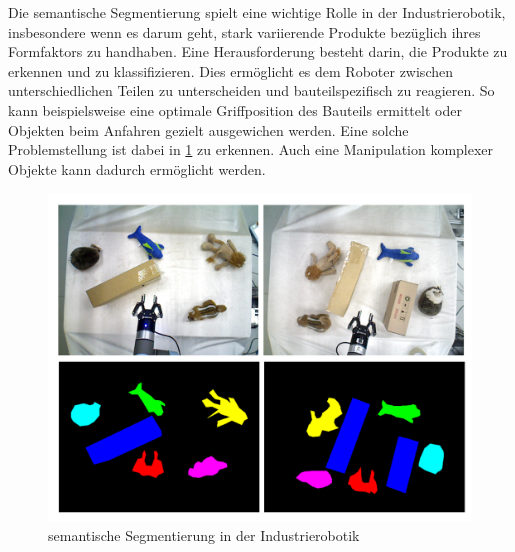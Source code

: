 Die semantische Segmentierung spielt eine wichtige Rolle in der
Industrierobotik, insbesondere wenn es darum geht, stark variierende Produkte
bezüglich ihres Formfaktors zu handhaben. Eine Herausforderung besteht darin,
die Produkte zu erkennen und zu klassifizieren. Dies ermöglicht es dem Roboter
zwischen unterschiedlichen Teilen zu unterscheiden und bauteilspezifisch zu
reagieren. So kann beispielsweise eine optimale Griffposition des Bauteils
ermittelt oder Objekten beim Anfahren gezielt ausgewichen werden. Eine
solche Problemstellung ist dabei in \ref{fig:SS_robotics} zu erkennen. Auch
eine Manipulation komplexer Objekte kann dadurch ermöglicht werden.
\cite{liu2020real}

\begin{figure}[h]
    \centering
    \includegraphics[width=1\textwidth]{bilder/semantic_segmentation_Robotics.png}
    \captionsetup{font=small} %

    \caption[semantische Segmentierung in der industrierobotik]{semantische Segmentierung in der Industrierobotik \cite{liu2020real}}
    \label{fig:SS_robotics}
\end{figure}

